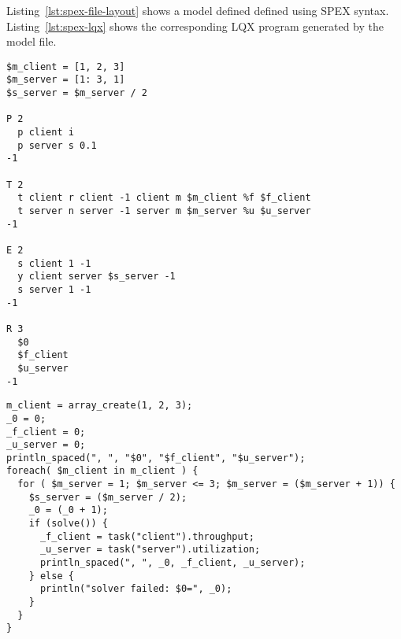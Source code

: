 Listing~\ref{lst:spex-file-layout} shows a model defined defined using SPEX syntax.
Listing~\ref{lst:spex-lqx} shows the corresponding LQX program generated by the model file.  

\lstset{language=LQN,basicstyle=\ttfamily,numbersep=10pt,firstnumber=1}
\begin{lstlisting}[float,caption={SPEX file layout.},label=lst:spex-file-layout]
$m_client = [1, 2, 3]
$m_server = [1: 3, 1]
$s_server = $m_server / 2

P 2
  p client i
  p server s 0.1
-1

T 2
  t client r client -1 client m $m_client %f $f_client
  t server n server -1 server m $m_server %u $u_server
-1

E 2
  s client 1 -1
  y client server $s_server -1
  s server 1 -1
-1

R 3
  $0
  $f_client
  $u_server
-1
\end{lstlisting}

\lstset{language=LQX,basicstyle=\ttfamily,numbersep=10pt,firstnumber=1,texcl=false}
\begin{lstlisting}[float,caption={LQX Program for SPEX input.},label=lst:spex-lqx]
m_client = array_create(1, 2, 3);
_0 = 0;
_f_client = 0;
_u_server = 0;
println_spaced(", ", "$0", "$f_client", "$u_server");
foreach( $m_client in m_client ) { 
  for ( $m_server = 1; $m_server <= 3; $m_server = ($m_server + 1)) {
    $s_server = ($m_server / 2);
    _0 = (_0 + 1);
    if (solve()) {
      _f_client = task("client").throughput;
      _u_server = task("server").utilization;
      println_spaced(", ", _0, _f_client, _u_server);
    } else {
      println("solver failed: $0=", _0);
    }
  }
}
\end{lstlisting}




